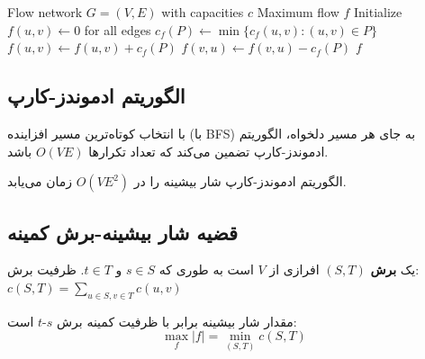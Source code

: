 \documentclass{matinbook}
\begin{document}
    \begin{latin}
        \begin{algorithm}
            \begin{algorithmic}[1]
                \Require Flow network $G = (V, E)$ with capacities $c$
                \Ensure Maximum flow $f$
                \State Initialize $f(u, v) \gets 0$ for all edges
                \State $c_{f}(P) \gets \min\{c_{f}(u, v) : (u, v) \in P\}$
                \State $f(u, v) \gets f(u, v) + c_{f}(P)$
                \State $f(v, u) \gets f(v, u) - c_{f}(P)$
                \EndFor
                \EndWhile
                \State \Return $f$
            \end{algorithmic}
        \end{algorithm}
    \end{latin}
    
    \subsection{الگوریتم ادموندز-کارپ}
    
    با انتخاب کوتاه‌ترین مسیر افزاینده
    (با BFS) به جای هر مسیر دلخواه،
    الگوریتم ادموندز-کارپ
    تضمین می‌کند که تعداد تکرارها $O(VE)$ باشد.
    
    \begin{theorem}
        الگوریتم ادموندز-کارپ شار بیشینه را
        در $O(VE^{2})$ زمان می‌یابد.
        \label{thm:edmonds-karp}
    \end{theorem}
    
    \subsection{قضیه شار بیشینه-برش کمینه}
    
    \begin{definition}[برش $s$-$t$]
        یک \textbf{برش}
        $(S, T)$ افرازی از $V$ است
        به طوری که $s \in S$ و $t \in T$.
        ظرفیت برش: $c(S, T) = \sum_{u \in S, v \in T} c(u, v)$
        \label{def:cut}
    \end{definition}
    
    \begin{theorem}
        مقدار شار بیشینه برابر با ظرفیت
        کمینه برش $s$-$t$ است:
        \[
        \max_{f} |f| = \min_{(S, T)} c(S, T)
        \]
        \label{thm:max-flow-min-cut}
    \end{theorem}
    
\end{document}

